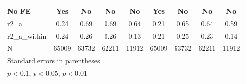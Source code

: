 {\begin{tabular}{l*{8}{c}}
\addlinespace
No FE               &         Yes         &          No         &          No         &          No         &         Yes         &          No         &          No         &          No         \\
\midrule
r2\_a                &        0.24         &        0.69         &        0.69         &        0.64         &        0.21         &        0.65         &        0.64         &        0.59         \\
r2\_a\_within         &        0.24         &        0.26         &        0.26         &        0.13         &        0.21         &        0.25         &        0.23         &        0.14         \\
N                   &       65009         &       63732         &       62211         &       11912         &       65009         &       63732         &       62211         &       11912         \\
\bottomrule
\multicolumn{9}{l}{\footnotesize Standard errors in parentheses}\\
\multicolumn{9}{l}{\footnotesize \sym{*} \(p<0.1\), \sym{**} \(p<0.05\), \sym{***} \(p<0.01\)}\\
\end{tabular}
}
